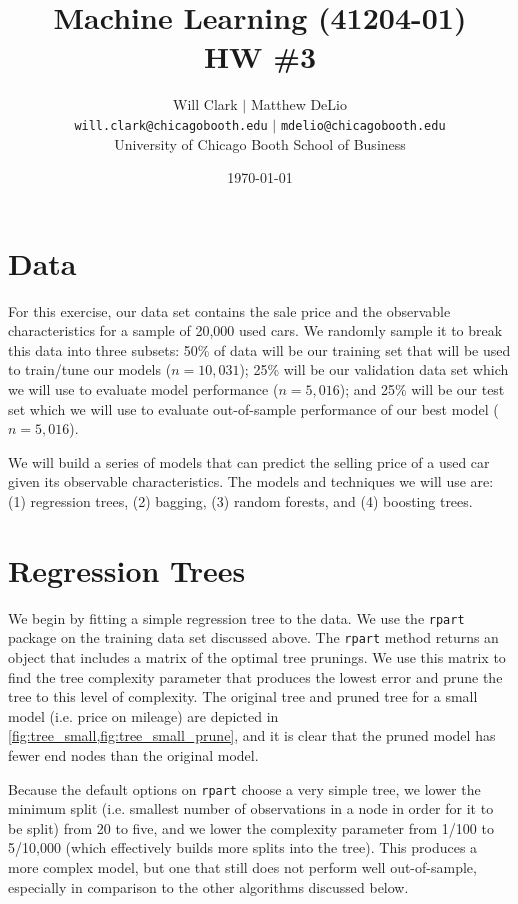 \documentclass[11pt, fleqn]{article}
\begin{document}
\title{Machine Learning (41204-01)\\HW \#3}
\author{Will Clark $\vert$ Matthew DeLio \\
\texttt{will.clark@chicagobooth.edu} $\vert$ \texttt{mdelio@chicagobooth.edu} \\
University of Chicago Booth School of Business}
\date{\today}
\maketitle

\section{Data}

For this exercise, our data set contains the sale price and the observable characteristics for a sample of 20,000 used cars. We randomly sample it to break this data into three subsets: 50\% of data will be our training set that will be used to train/tune our models ($n=10,031$); 25\% will be our validation data set which we will use to evaluate model performance ($n=5,016$); and 25\% will be our test set which we will use to evaluate out-of-sample performance of our best model ($n=5,016$).

We will build a series of models that can predict the selling price of a used car given its observable characteristics. The models and techniques we will use are: (1) regression trees, (2) bagging, (3) random forests, and (4) boosting trees.

\section{Regression Trees}

We begin by fitting a simple regression tree to the data. We use the \texttt{rpart} package on the training data set discussed above. The \texttt{rpart} method returns an object that includes a matrix of the optimal tree prunings. We use this matrix to find the tree complexity parameter that produces the lowest error and prune the tree to this level of complexity. The original tree and pruned tree for a small model (i.e. price on mileage) are depicted in \cref{fig:tree_small,fig:tree_small_prune}, and it is clear that the pruned model has fewer end nodes than the original model.

Because the default options on \texttt{rpart} choose a very simple tree, we lower the minimum split (i.e. smallest number of observations in a node in order for it to be split) from 20 to five, and we lower the complexity parameter from 1/100 to 5/10,000 (which effectively builds more splits into the tree). This produces a more complex model, but one that still does not perform well out-of-sample, especially in comparison to the other algorithms discussed below.
\end{document}
